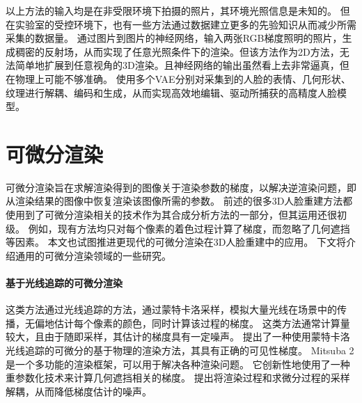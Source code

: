 以上方法的输入均是在非受限环境下拍摄的照片，其环境光照信息是未知的。
但在实验室的受控环境下，也有一些方法通过数据建立更多的先验知识从而减少所需采集的数据量。
\citet{MekaHPZFFKYBDDB19}通过图片到图片的神经网络，输入两张RGB梯度照明的照片，生成稠密的反射场，从而实现了任意光照条件下的渲染。但该方法作为2D方法，无法简单地扩展到任意视角的3D渲染。且神经网络的输出虽然看上去非常逼真，但在物理上可能不够准确。
\citet{ZhangZZLCYXY22}使用多个VAE分别对采集到的人脸的表情、几何形状、纹理进行解耦、编码和生成，从而实现高效地编辑、驱动所捕获的高精度人脸模型。

\section{可微分渲染}

可微分渲染旨在求解渲染得到的图像关于渲染参数的梯度，以解决逆渲染问题，即从渲染结果的图像中恢复渲染该图像所需的参数。
前述的很多3D人脸重建方法都使用到了可微分渲染相关的技术作为其合成分析方法的一部分，但其运用还很初级。
例如，现有方法均只对每个像素的着色过程计算了梯度，而忽略了几何遮挡等因素。
本文也试图推进更现代的可微分渲染在3D人脸重建中的应用。
下文将介绍通用的可微分渲染领域的一些研究。

\paragraph{基于光线追踪的可微分渲染}
这类方法通过光线追踪的方法，通过蒙特卡洛采样，模拟大量光线在场景中的传播，无偏地估计每个像素的颜色，同时计算该过程的梯度。
这类方法通常计算量较大，且由于随即采样，其估计的梯度具有一定噪声。
\citet{redner}提出了一种使用蒙特卡洛光线追踪的可微分的基于物理的渲染方法，其具有正确的可见性梯度。
Mitsuba 2\citep{Mitsuba2}是一个多功能的渲染框架，可以用于解决各种渲染问题。
它创新性地使用了一种重参数化技术来计算几何遮挡相关的梯度。
\citet{ZeltnerSGJ21}提出将渲染过程和求微分过程的采样解耦，从而降低梯度估计的噪声。

